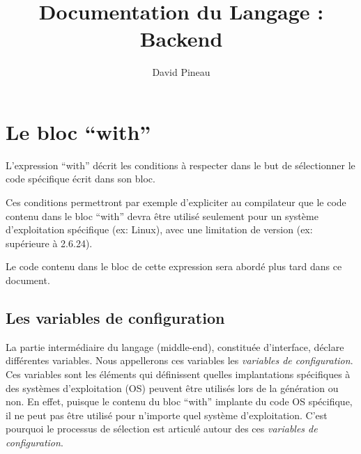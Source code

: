 \documentclass[french]{rtxreport}
\author{David Pineau}
\title{Documentation du Langage : Backend}
\begin{document}
\maketitle

\rtxmaketitleblock

\tableofcontents


\chapter{Le bloc “with”}

L'expression “with” décrit les conditions à respecter dans le but de
sélectionner le code spécifique écrit dans son bloc.

Ces conditions permettront par exemple d'expliciter au compilateur que le code
contenu dans le bloc “with” devra être utilisé seulement pour un système
d'exploitation spécifique (ex: Linux), avec une limitation de version
(ex: supérieure à 2.6.24).

Le code contenu dans le bloc de cette expression sera abordé plus tard dans ce
document.

\section{Les variables de configuration}

La partie intermédiaire du langage (middle-end), constituée d'interface, déclare
différentes variables. Nous appellerons ces variables les \emph{variables de
configuration}. Ces variables sont les éléments qui définissent quelles
implantations spécifiques à des systèmes d'exploitation (OS) peuvent être
utilisés lors de la génération ou non. En effet, puisque le contenu du bloc
“with” implante du code OS spécifique, il ne peut pas être utilisé pour
n'importe quel système d'exploitation. C'est pourquoi le processus de sélection
est articulé autour des ces \emph{variables de configuration}.
\end{document}
